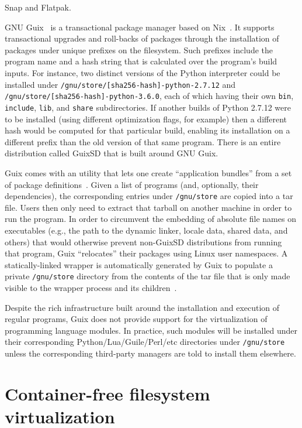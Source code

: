 \documentclass[sigplan, anonymous]{acmart}
\begin{document}
Snap and Flatpak.


GNU Guix~\cite{courtes2013guix} is a transactional package manager based on Nix~\cite{dolstra2004nix}.
It supports transactional upgrades and
roll-backs of packages through the installation of packages under unique prefixes on the filesystem.
Such prefixes include the program name and a hash string that is calculated over the program's
build inputs. For instance, two distinct versions of the Python interpreter could be installed
under \texttt{/gnu/store/[sha256-hash]-python-2.7.12} and \texttt{/gnu/store/[sha256-hash]-python-3.6.0},
each of which having their own \texttt{bin}, \texttt{include}, \texttt{lib}, and \texttt{share}
subdirectories. If another builds of Python 2.7.12 were to be installed (using different optimization
flags, for example) then a different hash would be computed for that particular build, enabling its
installation on a different prefix than the old version of that same program. There is an entire
distribution called GuixSD that is built around GNU Guix.

Guix comes with an utility that lets one create ``application bundles'' from a set of package
definitions~\cite{gnu2017bundles}. Given a list of programs (and, optionally, their dependencies),
the corresponding entries under \texttt{/gnu/store} are copied into a tar file. Users then only
need to extract that tarball on another machine in order to run the program. In order to circumvent
the embedding of absolute file names on executables (e.g., the path to the dynamic linker, locale
data, shared data, and others) that would otherwise prevent non-GuixSD distributions from running
that program, Guix ``relocates'' their packages using Linux user namespaces. A statically-linked
wrapper is automatically generated by Guix to populate a private \texttt{/gnu/store} directory
from the contents of the tar file that is only made visible to the wrapper process and its
children~\cite{gnu2018tarballs}.

Despite the rich infrastructure built around the installation and execution of regular programs,
Guix does not provide support for the virtualization of programming language modules. In practice,
such modules will be installed under their corresponding Python/Lua/Guile/Perl/etc directories
under \texttt{/gnu/store} unless the corresponding third-party managers are told to install them
elsewhere.


\section{Container-free filesystem virtualization}
\end{document}
